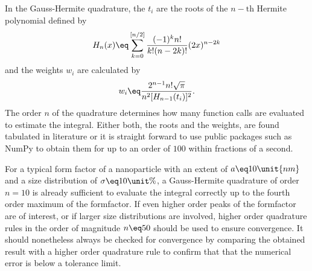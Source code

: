 \documentclass[\main/dresen_thesis.tex]{subfiles}
\begin{document}
    In the Gauss-Hermite quadrature, the $t_{i}$ are the roots of the $n-\mathrm{th}$ Hermite polynomial defined by
    \begin{align}
    H_n (x) \eq \sum_{k=0}^{[n/2]} \frac{(-1)^k n!}{k! (n-2k)!} (2x)^{n-2k}
    \end{align}
    and the weights $w_{i}$ are calculated by
    \begin{align}
    w_i \eq \frac{2^{n-1} n! \sqrt{\pi}}{n^2 [H_{n-1}(t_i)]^2}.
    \end{align}
    The order $n$ of the quadrature determines how many function calls are evaluated to estimate the integral.
    Either both, the roots and the weights, are found tabulated in literature or it is straight forward to use public packages such as NumPy to obtain them for up to an order of $100$ \cite{Oliphant_2006_Guide} within fractions of a second.

    For a typical form factor of a nanoparticle with an extent of $a \eq 10 \unit{nm}$ and a size distribution of $\sigma \eq 10 \unit{\%}$, a Gauss-Hermite quadrature of order $n=10$ is already sufficient to evaluate the integral correctly up to the fourth order maximum of the formfactor.
    If even higher order peaks of the formfactor are of interest, or if larger size distributions are involved, higher order quadrature rules in the order of magnitude $n\eq50$ should be used to ensure convergence.
    It should nonetheless always be checked for convergence by comparing the obtained result with a higher order quadrature rule to confirm that that the numerical error is below a tolerance limit.
\end{document}
